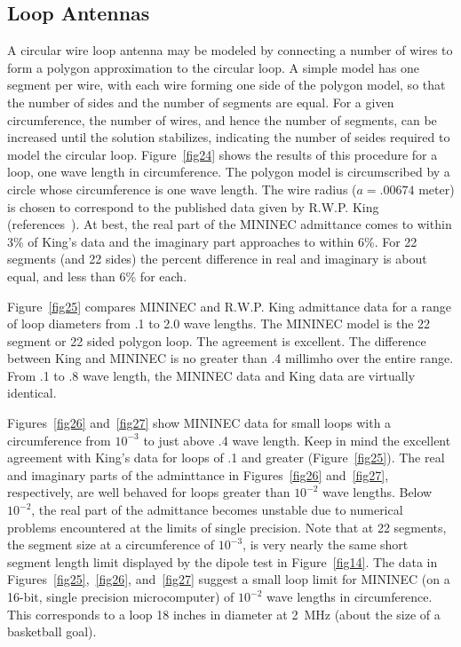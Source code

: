\documentclass[12pt]{article}
\begin{document}
\subsection{Loop Antennas}
A circular wire loop antenna may be modeled by connecting a number of
wires to form a polygon approximation to the circular loop. A simple
model has one segment per wire, with each wire forming one side of the
polygon model, so that the number of sides and the number of segments
are equal. For a given circumference, the number of wires, and hence the
number of segments, can be increased until the solution stabilizes,
indicating the number of seides required to model the circular loop.
Figure~\ref{fig24} shows the results of this procedure for a loop, one
wave length in circumference. The polygon model is circumscribed by a
circle whose circumference is one wave length. The wire radius
($a=.00674$ meter) is chosen to correspond to the published data given
by R.W.P. King (references~\cite{r9}). At best, the real part of the
MININEC admittance comes to within 3\% of King's data and the imaginary
part approaches to within 6\%. For 22 segments (and 22 sides) the
percent difference in real and imaginary is about equal, and less than
6\% for each.

Figure~\ref{fig25} compares MININEC and R.W.P. King admittance data for
a range of loop diameters from .1 to 2.0 wave lengths. The MININEC model
is the 22 segment or 22 sided polygon loop. The agreement is excellent.
The difference between King and MININEC is no greater than .4 millimho
over the entire range. From .1 to .8 wave length, the MININEC data and
King data are virtually identical.

Figures~\ref{fig26} and~\ref{fig27} show MININEC data for small loops
with a circumference from $10^{-3}$ to just above .4 wave length. Keep
in mind the excellent agreement with King's data for loops of .1 and
greater (Figure~\ref{fig25}). The real and imaginary parts of the
adminttance in Figures~\ref{fig26} and~\ref{fig27}, respectively, are
well behaved for loops greater than $10^{-2}$ wave lengths. Below
$10^{-2}$, the real part of the admittance becomes unstable due to
numerical problems encountered at the limits of single precision. Note
that at 22 segments, the segment size at a circumference of $10^{-3}$,
is very nearly the same short segment length limit displayed by the
dipole test in Figure~\ref{fig14}. The data in
Figures~\ref{fig25},~\ref{fig26}, and~\ref{fig27} suggest a small loop
limit for MININEC (on a 16-bit, single precision microcomputer) of
$10^{-2}$ wave lengths in circumference. This corresponds to a loop 18
inches in diameter at 2~MHz (about the size of a basketball goal).
\end{document}
